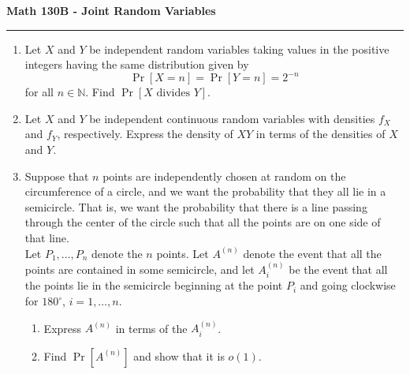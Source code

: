 \documentclass[11pt,letterpaper]{report}
\newcommand{\naturals}{\mathbb{N}}
\begin{document}
\begin{center}
{\bf \Large Math 130B - Joint Random Variables}
\vspace{0.2cm}
\hrule
\end{center}

\begin{enumerate}
	\item Let $X$ and $Y$ be independent random variables taking values in the positive integers having the same distribution given by
	\[
	\Pr[X = n] = \Pr[Y = n] = 2^{-n}
	\]
	for all $n\in \naturals$. Find $\Pr[X\text{ divides }Y]$.

	\vfill

	\item Let $X$ and $Y$ be independent continuous random variables with densities $f_X$ and $f_Y$, respectively. Express the density of $XY$ in terms of the densities of $X$ and $Y$.

	\vfill

	\item Suppose that $n$ points are independently chosen at random on the circumference of a circle, and we want the probability that they all lie in a semicircle. That is, we want the probability that there is a line passing through the center of the circle such that all the points are on one side of that line.\\

	\noindent Let $P_1, \ldots, P_n$ denote the $n$ points. Let $A^{(n)}$ denote the event that all the points are contained in some semicircle, and let $A^{(n)}_i$ be the event that all the points lie in the semicircle beginning at the point $P_i$ and going clockwise for $180^\circ$, $i = 1, \ldots, n$.
	\begin{enumerate}
		\item Express $A^{(n)}$ in terms of the $A^{(n)}_i$.
		\item Find $\Pr[A^{(n)}]$ and show that it is $o(1)$.
	\end{enumerate}

	\vfill
\end{enumerate}
\end{document}
